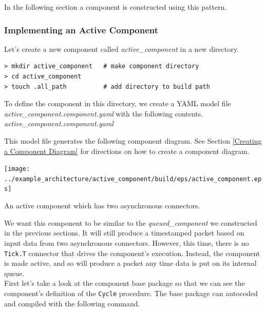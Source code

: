 In the following section a component is constructed using this pattern.

\subsubsection{Implementing an Active Component}

Let's create a new component called \textit{active\_component} in a new directory.

\vspace{5mm} %
\begin{verbatim}
> mkdir active_component   # make component directory
> cd active_component 
> touch .all_path          # add directory to build path
\end{verbatim}
\vspace{5mm} %

To define the component in this directory, we create a YAML model file \textit{active\_component.component.yaml} with the following contents. \\

\textit{active\_component.component.yaml}

This model file generates the following component diagram. See Section \ref{Creating a Component Diagram} for directions on how to create a component diagram.

\vspace{5mm} %
\texttt{[image: ../example\_architecture/active\_component/build/eps/active\_component.eps]}
\caption{An active component which has two asynchronous connectors.}
\vspace{5mm} %

We want this component to be similar to the \textit{queued\_component} we constructed in the previous sections. It will still produce a timestamped packet based on input data from two asynchronous connectors. However, this time, there is no \texttt{Tick.T} connector that drives the component's execution. Instead, the component is made active, and so will produce a packet any time data is put on its internal queue. \\

First let's take a look at the component base package so that we can see the component's definition of the \texttt{Cycle} procedure. The base package can autocoded and compiled with the following command.

